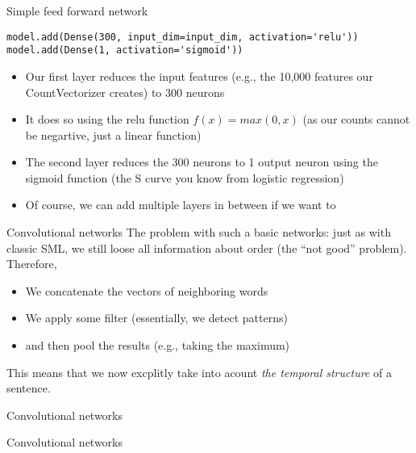 \begin{frame}[fragile]{Simple feed forward network}
\begin{lstlisting}
model.add(Dense(300, input_dim=input_dim, activation='relu'))
model.add(Dense(1, activation='sigmoid'))
\end{lstlisting}	
	
\begin{itemize}[<+->]
\item Our first layer reduces the input features (e.g., the 10,000 features our CountVectorizer creates) to 300 neurons
\item It does so using the relu function $f(x) = max(0, x)$ (as our counts cannot be negartive, just a linear function)
\item The second layer reduces the 300 neurons to 1 output neuron using the sigmoid function (the S curve you know from logistic regression)
\item Of course, we can add multiple layers in between if we want to
\end{itemize}
\end{frame}





\begin{frame}{Convolutional networks}
  The problem with such a basic networks: just as with classic SML, we still loose all information about order (the ``not good'' problem).
  Therefore,
  \begin{itemize}
  \item We concatenate the vectors of neighboring words
  \item We apply some filter (essentially, we detect patterns)
  \item and then pool the results (e.g., taking the maximum)
  \end{itemize}
  This means that we now excplitly take into acount \emph{the temporal structure} of a sentence.
\end{frame}



\begin{frame}{Convolutional networks}
\end{frame}

\begin{frame}{Convolutional networks}
  \end{frame}



